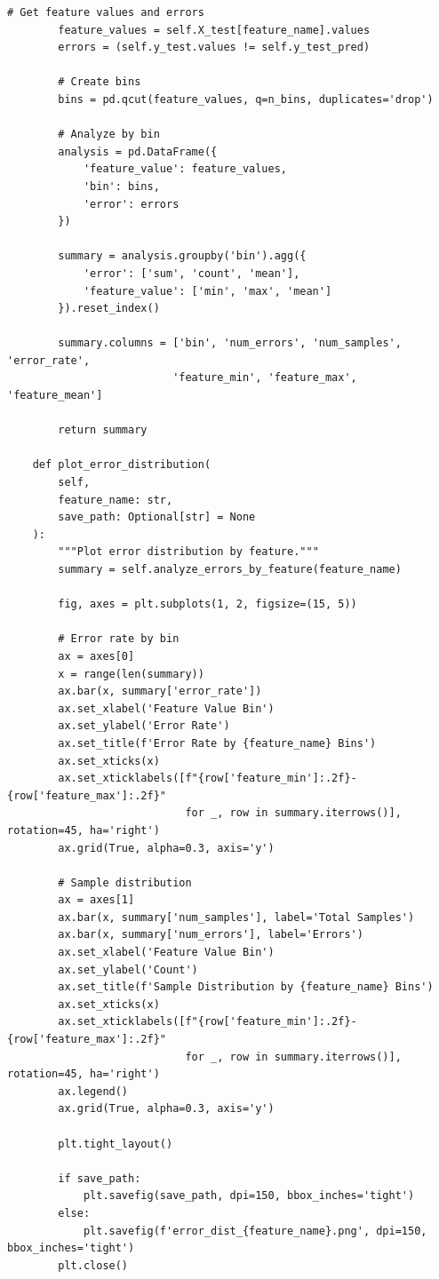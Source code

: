 \begin{lstlisting}[style=python, caption={Comprehensive Model Diagnostic Tools}]
        # Get feature values and errors
        feature_values = self.X_test[feature_name].values
        errors = (self.y_test.values != self.y_test_pred)

        # Create bins
        bins = pd.qcut(feature_values, q=n_bins, duplicates='drop')

        # Analyze by bin
        analysis = pd.DataFrame({
            'feature_value': feature_values,
            'bin': bins,
            'error': errors
        })

        summary = analysis.groupby('bin').agg({
            'error': ['sum', 'count', 'mean'],
            'feature_value': ['min', 'max', 'mean']
        }).reset_index()

        summary.columns = ['bin', 'num_errors', 'num_samples', 'error_rate',
                          'feature_min', 'feature_max', 'feature_mean']

        return summary

    def plot_error_distribution(
        self,
        feature_name: str,
        save_path: Optional[str] = None
    ):
        """Plot error distribution by feature."""
        summary = self.analyze_errors_by_feature(feature_name)

        fig, axes = plt.subplots(1, 2, figsize=(15, 5))

        # Error rate by bin
        ax = axes[0]
        x = range(len(summary))
        ax.bar(x, summary['error_rate'])
        ax.set_xlabel('Feature Value Bin')
        ax.set_ylabel('Error Rate')
        ax.set_title(f'Error Rate by {feature_name} Bins')
        ax.set_xticks(x)
        ax.set_xticklabels([f"{row['feature_min']:.2f}-{row['feature_max']:.2f}"
                            for _, row in summary.iterrows()], rotation=45, ha='right')
        ax.grid(True, alpha=0.3, axis='y')

        # Sample distribution
        ax = axes[1]
        ax.bar(x, summary['num_samples'], label='Total Samples')
        ax.bar(x, summary['num_errors'], label='Errors')
        ax.set_xlabel('Feature Value Bin')
        ax.set_ylabel('Count')
        ax.set_title(f'Sample Distribution by {feature_name} Bins')
        ax.set_xticks(x)
        ax.set_xticklabels([f"{row['feature_min']:.2f}-{row['feature_max']:.2f}"
                            for _, row in summary.iterrows()], rotation=45, ha='right')
        ax.legend()
        ax.grid(True, alpha=0.3, axis='y')

        plt.tight_layout()

        if save_path:
            plt.savefig(save_path, dpi=150, bbox_inches='tight')
        else:
            plt.savefig(f'error_dist_{feature_name}.png', dpi=150, bbox_inches='tight')
        plt.close()


\end{lstlisting}
